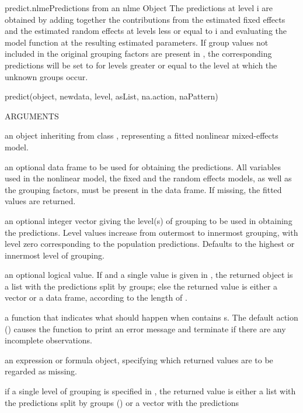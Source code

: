 \documentclass[pdftex]{article} \usepackage{url,graphicx}
\begin{document}
\begin{Helpfile}{predict.nlme}{Predictions from an nlme Object}
The predictions at level i are obtained by adding together the
contributions from the estimated fixed effects and the estimated
random effects at levels less or equal to i and evaluating the
model function at the resulting estimated parameters. If group values
not included in the original grouping factors  are present in
, the corresponding predictions will be  set to
 for levels greater or equal to the level at which the 
unknown groups occur.
\begin{Example}
predict(object, newdata, level, asList, na.action, naPattern)
\end{Example}
\begin{Argument}{ARGUMENTS}
\item[\Co{object:}]
an object inheriting from class , representing
a fitted nonlinear mixed-effects model.
\item[\Co{newdata:}]
an optional data frame to be used for obtaining the
predictions. All variables used in the nonlinear model, the fixed and
the random effects models, as well as the grouping factors, must be
present in the data frame. If missing, the fitted values are returned.
\item[\Co{level:}]
an optional integer vector giving the level(s) of grouping
to be used in obtaining the predictions. Level values increase from
outermost to innermost grouping, with level zero corresponding to the
population predictions. Defaults to the highest or innermost level of
grouping.
\item[\Co{asList:}]
an optional logical value. If  and a single
value is given in , the returned object is a list with
the predictions split by groups; else the returned value is
either a vector or a data frame, according to the length of
. 
\item[\Co{na.action:}]
a function that indicates what should happen when
 contains s.  The default action
() causes the function to print an error message and
terminate if there are any incomplete observations.
\item[\Co{naPattern:}]
an expression or formula object, specifying which returned
values are to be regarded as missing.
\end{Argument}
if a single level of grouping is specified in , the
returned value is either a list with the predictions split by groups
() or a vector with the predictions

\end{Helpfile}
\end{document}
